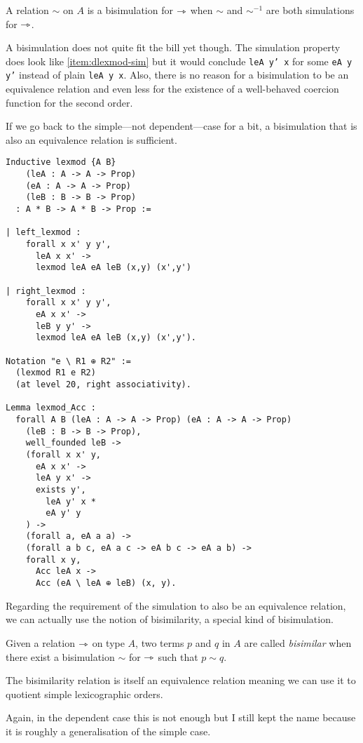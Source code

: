\begin{definition}[Bisimulation]
  A relation \(\sim\) on \(A\) is a bisimulation for \(\rightarrowtriangle\) when \(\sim\)
  and \(\sim^{-1}\) are both simulations for \(\rightarrowtriangle\).
\end{definition}

A bisimulation does not quite fit the bill yet though. The simulation property
does look like \ref{item:dlexmod-sim} but it would conclude
\texttt{leA y' x} for some \texttt{eA y y'} instead of plain
\texttt{leA y x}. Also, there is no reason for a bisimulation to
be an equivalence relation and even less for the existence of a well-behaved
coercion function for the second order.

If we go back to the simple---\ie not dependent---case for a bit, a bisimulation
that is also an equivalence relation is sufficient.

\begin{verbatim}
Inductive lexmod {A B}
    (leA : A -> A -> Prop)
    (eA : A -> A -> Prop)
    (leB : B -> B -> Prop)
  : A * B -> A * B -> Prop :=

| left_lexmod :
    forall x x' y y',
      leA x x' ->
      lexmod leA eA leB (x,y) (x',y')

| right_lexmod :
    forall x x' y y',
      eA x x' ->
      leB y y' ->
      lexmod leA eA leB (x,y) (x',y').

Notation "e \ R1 ⊕ R2" :=
  (lexmod R1 e R2)
  (at level 20, right associativity).

Lemma lexmod_Acc :
  forall A B (leA : A -> A -> Prop) (eA : A -> A -> Prop)
    (leB : B -> B -> Prop),
    well_founded leB ->
    (forall x x' y,
      eA x x' ->
      leA y x' ->
      exists y',
        leA y' x *
        eA y' y
    ) ->
    (forall a, eA a a) ->
    (forall a b c, eA a c -> eA b c -> eA a b) ->
    forall x y,
      Acc leA x ->
      Acc (eA \ leA ⊕ leB) (x, y).
\end{verbatim}

Regarding the requirement of the simulation to also be an equivalence relation,
we can actually use the notion of bisimilarity, a special kind of bisimulation.

\begin{definition}[Bisimilarity]
  Given a relation \(\rightarrowtriangle\) on type \(A\), two terms \(p\) and \(q\) in \(A\)
  are called \emph{bisimilar} when there exist a bisimulation \(\sim\) for
  \(\rightarrowtriangle\) such that \(p \sim q\).
\end{definition}

The bisimilarity relation is itself an equivalence relation meaning we can use
it to quotient simple lexicographic orders.

Again, in the dependent case this is not enough but I still kept the name
because it is roughly a generalisation of the simple case.